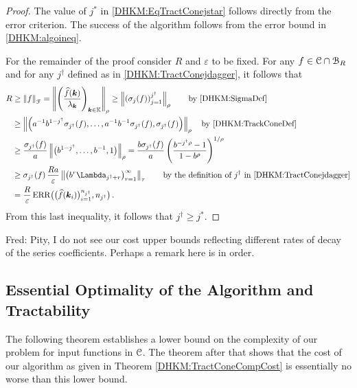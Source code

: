 \documentclass[USenglish]{article}
\theoremstyle{dgthm}
\theoremstyle{dgthm}
\theoremstyle{dgthm}
\theoremstyle{dgthm}
\theoremstyle{dgdef}
\theoremstyle{definition}
\DeclareMathOperator{\ERR}{ERR}
\newcommand{\dataNjd}{\bigl(\hf(\bsk_i)\bigr)_{i=1}^{n_{j^\dagger}}}
\newcommand{\ERRNjd}{\ERR\bigl(\dataNjd,n_{j^\dagger}\bigr)}
\newcommand{\hf}{\widehat{f}}
\newcommand{\norm}[2][{}]{\ensuremath{\left \lVert #2 \right \rVert}_{#1}}
\newcommand{\FredNote}[1]{{\color{blue}Fred: #1}}
\begin{document}
\begin{proof}
The value of $j^*$ in \eqref{DHKM:EqTractConejstar} follows directly from the error criterion. The success of the algorithm follows from the error bound in \eqref{DHKM:algoineq}.

For the remainder of the proof consider $R$ and $\varepsilon$ to be fixed.  For any $f \in  {\mathcal{C}} \cap {\mathcal{B}}_R$ and for any $j^\dagger$ defined  as in \eqref{DHKM:TractConejdagger}, it follows that
\begin{align*}
R &\ge \norm[\calF]{f} = \norm[\rho]{\left(\frac{\hf(\bsk)}{\lambda_{\bsk}} \right)_{\bsk \in \bbK}}
 \ge \norm[\rho]{\left(\sigma_j(f)\right)_{j=1}^{j^\dagger}}  
 \qquad \text{by \eqref{DHKM:SigmaDef} } \\
& \ge \norm[\rho]{\left(a^{-1}b^{1-j^\dagger}\sigma_{j^\dagger}(f), \ldots, a^{-1} b^{-1}\sigma_{j^\dagger}(f), \sigma_{j^\dagger}(f) \right) } \quad \text{by  \eqref{DHKM:TrackConeDef}}\\
& \ge \frac {\sigma_{j^\dagger}(f)} a \norm[\rho]{\bigl(b^{1-j^\dagger}, \ldots, b^{-1}, 1 \bigr) } 
= \frac {b\sigma_{j^\dagger}(f)} a \left( \frac{b^{-j^\dagger\rho} -1}{1 - b^\rho} \right)^{1/\rho}\\
& \ge \sigma_{j^\dagger}(f)\,\frac{Ra}{\varepsilon} \norm[\tau]{ \bigl(b^r\Lambda_{j^\dagger+r} \bigr)_{r=1}^\infty}
\qquad \text{by the definition of } j^\dagger \text{ in \eqref{DHKM:TractConejdagger}} \\
& = \frac{R}{\varepsilon} \ERRNjd\, .
\end{align*}
From this last inequality, it follows that $j^\dagger \ge j^*$.
\end{proof}

\FredNote{Pity, I do not see our cost upper bounds reflecting different rates of decay of the series coefficients.  Perhaps a remark here is in order.}


\subsection{Essential Optimality of the Algorithm and Tractability}


The following theorem establishes a lower bound on the complexity of our problem for input functions in ${\mathcal{C}}$. The theorem after that shows that the cost of our algorithm as given in Theorem \ref{DHKM:TractConeCompCost} is essentially no worse than this lower bound.
\end{document}
